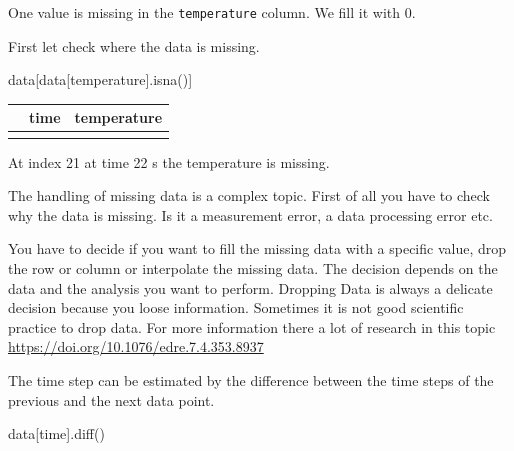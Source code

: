 \documentclass[
  letterpaper,
  DIV=11,
  numbers=noendperiod]{scrreprt}
\newenvironment{Shaded}{\begin{snugshade}}{\end{snugshade}}
\newcommand{\NormalTok}[1]{\textcolor[rgb]{0.00,0.23,0.31}{#1}}
\newcommand{\StringTok}[1]{\textcolor[rgb]{0.13,0.47,0.30}{#1}}
\begin{document}
One value is missing in the \texttt{temperature} column. We fill it with
0.

First let check where the data is missing.

\begin{Shaded}
\begin{Highlighting}[]
\NormalTok{data[data[}\StringTok{\textquotesingle{}temperature\textquotesingle{}}\NormalTok{].isna()]}
\end{Highlighting}
\end{Shaded}

\begin{longtable}[]{@{}lll@{}}
\toprule\noalign{}
& time & temperature \\
\midrule\noalign{}
\endhead
\bottomrule\noalign{}
\endlastfoot
\end{longtable}

At index 21 at time 22 s the temperature is missing.

\begin{tcolorbox}[enhanced jigsaw, leftrule=.75mm, bottomrule=.15mm, colbacktitle=quarto-callout-note-color!10!white, title=\textcolor{quarto-callout-note-color}{\faInfo}\hspace{0.5em}{Note}, breakable, arc=.35mm, toptitle=1mm, opacityback=0, titlerule=0mm, coltitle=black, colback=white, opacitybacktitle=0.6, colframe=quarto-callout-note-color-frame, left=2mm, rightrule=.15mm, toprule=.15mm, bottomtitle=1mm]

The handling of missing data is a complex topic. First of all you have
to check why the data is missing. Is it a measurement error, a data
processing error etc.

You have to decide if you want to fill the missing data with a specific
value, drop the row or column or interpolate the missing data. The
decision depends on the data and the analysis you want to perform.
Dropping Data is always a delicate decision because you loose
information. Sometimes it is not good scientific practice to drop data.
For more information there a lot of research in this topic
\url{https://doi.org/10.1076/edre.7.4.353.8937}

\end{tcolorbox}

The time step can be estimated by the difference between the time steps
of the previous and the next data point.

\begin{Shaded}
\begin{Highlighting}[]
\NormalTok{data[}\StringTok{\textquotesingle{}time\textquotesingle{}}\NormalTok{].diff()}
\end{Highlighting}
\end{Shaded}
\end{document}

